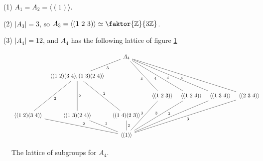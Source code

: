 \begin{example}\label{example_3.14}
  \begin{enumerate}
    \item[(1)] $A_1=A_2=\langle (1) \rangle$.

    \item[(2)] $|A_3|=3$, so $A_3=\langle (1 \ 2 \ 3) \rangle \simeq
      \faktor{\Z}{3\Z}$.

    \item[(3)] $|A_4|=12$, and $A_4$ has the following lattice of figure
      \ref{figure_3.5}
  \end{enumerate}
\end{example}

\begin{figure}[h]
  \[\begin{tikzcd}[column sep=tiny]
  && {A_4} \\
  & {\langle (1 \ 2)(3 \ 4),(1 \ 3)(2 \ 4) \rangle} \\
  &&&& {\langle (1 \ 2 \ 3) \rangle} & {\langle (1 \ 2 \ 4) \rangle} & {\langle (1 \ 3 \ 4) \rangle} & {\langle (2 \ 3 \ 4) \rangle} \\
    {\langle (1 \ 2)(3 \ 4) \rangle} & {\langle (1 \ 3)(2 \ 4) \rangle} & {\langle (1 \ 4)(2 \ 3) \rangle} \\
                                     && {\langle (1) \rangle}
                                     \arrow["4"', no head, from=1-3, to=3-5]
                                     \arrow["4"', no head, from=1-3, to=3-6]
                                     \arrow["4"', no head, from=1-3, to=3-7]
                                     \arrow["4"', no head, from=1-3, to=3-8]
                                     \arrow["3", no head, from=3-8, to=5-3]
                                     \arrow["3"', no head, from=3-7, to=5-3]
                                     \arrow["3"', no head, from=3-6, to=5-3]
                                     \arrow["3"', no head, from=3-5, to=5-3]
                                     \arrow["2", no head, from=4-2, to=5-3]
                                     \arrow["2", no head, from=4-1, to=5-3]
                                     \arrow["2", no head, from=4-3, to=5-3]
                                     \arrow["3", no head, from=1-3, to=2-2]
                                     \arrow["2", no head, from=2-2, to=4-2]
                                     \arrow["2", no head, from=2-2, to=4-3]
                                     \arrow["2", no head, from=2-2, to=4-1]
  \end{tikzcd}\]
  \caption{The lattice of subgroups for $A_4$.}
  \label{figure_3.5}
\end{figure}
